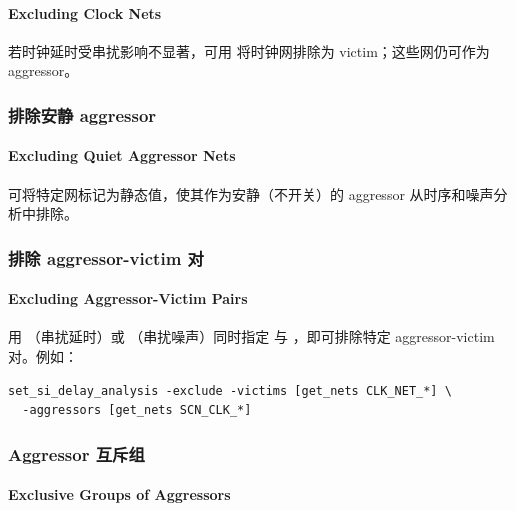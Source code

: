 \paragraph*{Excluding Clock Nets}

若时钟延时受串扰影响不显著，可用  将时钟网排除为 victim；这些网仍可作为 aggressor。

\subsubsection{排除安静 aggressor}
\paragraph*{Excluding Quiet Aggressor Nets}

 可将特定网标记为静态值，使其作为安静（不开关）的 aggressor 从时序和噪声分析中排除。

\subsubsection{排除 aggressor-victim 对}
\paragraph*{Excluding Aggressor-Victim Pairs}

用 （串扰延时）或 （串扰噪声）同时指定  与 ，即可排除特定 aggressor-victim 对。例如：
\begin{lstlisting}
set_si_delay_analysis -exclude -victims [get_nets CLK_NET_*] \
  -aggressors [get_nets SCN_CLK_*]
\end{lstlisting}

\subsubsection{Aggressor 互斥组}
\paragraph*{Exclusive Groups of Aggressors}



